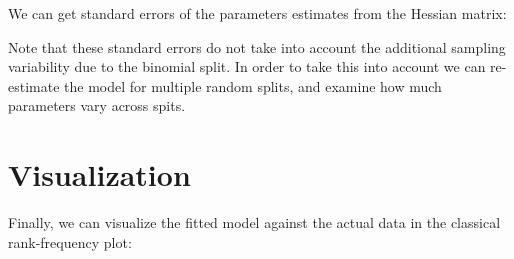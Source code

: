 \documentclass[
]{book}
\newenvironment{Shaded}{\begin{snugshade}}{\end{snugshade}}
\newcommand{\CommentTok}[1]{\textcolor[rgb]{0.56,0.35,0.01}{\textit{#1}}}
\newcommand{\FunctionTok}[1]{\textcolor[rgb]{0.13,0.29,0.53}{\textbf{#1}}}
\newcommand{\NormalTok}[1]{#1}
\newcommand{\SpecialCharTok}[1]{\textcolor[rgb]{0.81,0.36,0.00}{\textbf{#1}}}
\begin{document}
\begin{Shaded}
\end{Shaded}

We can get standard errors of the parameters estimates from the Hessian matrix:

\begin{Shaded}
\end{Shaded}

Note that these standard errors do not take into account the additional sampling variability due to the binomial split. In order to take this into account we can re-estimate the model for multiple random splits, and examine how much parameters vary across spits.

\section{Visualization}\label{visualization}

Finally, we can visualize the fitted model against the actual data in the classical rank-frequency plot:
\end{document}
